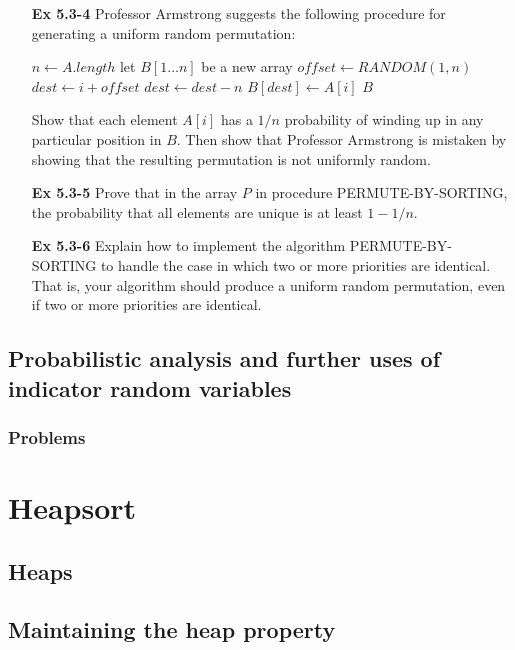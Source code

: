 \documentclass[fontsize=12pt,paper=a4]{book}
\newcommand{\To}{\ \textbf{to}\ }
\begin{document}
\begin{enumerate}
 \item[\textbf{Ex 5.3-4}]
       Professor Armstrong suggests the following procedure for generating a uniform random permutation:
       \begin{algorithmic}
        \State $n \gets A.length$
        \State let $B[1 \dots n]$ be a new array
        \State $offset \gets RANDOM(1,n)$
        \For{$i \gets 1$ \To $n$}
        \State $dest \gets i + offset$
        \State $dest \gets dest - n$
        \EndIf
        \State $B[dest] \gets A[i]$
        \EndFor
        \State \Return $B$\;
        \EndProcedure
       \end{algorithmic}
       Show that each element $A[i]$ has a $1/n$ probability of winding up in any particular position in $B$. Then show that Professor Armstrong is mistaken by showing that the resulting permutation is not uniformly random.
       
 \item[\textbf{Ex 5.3-5}]
       Prove that in the array $P$ in procedure PERMUTE-BY-SORTING, the probability that all elements are unique is at least $1-1/n$.
       
 \item[\textbf{Ex 5.3-6}]
       Explain how to implement the algorithm PERMUTE-BY-SORTING to handle the case in which two or more priorities are identical. That is, your algorithm should produce a uniform random permutation, even if two or more priorities are identical.
\end{enumerate}

\section{Probabilistic analysis and further uses of indicator random variables}

\subsection*{Problems}


\chapter{Heapsort}

\section{Heaps}

\section{Maintaining the heap property}
\end{document}
